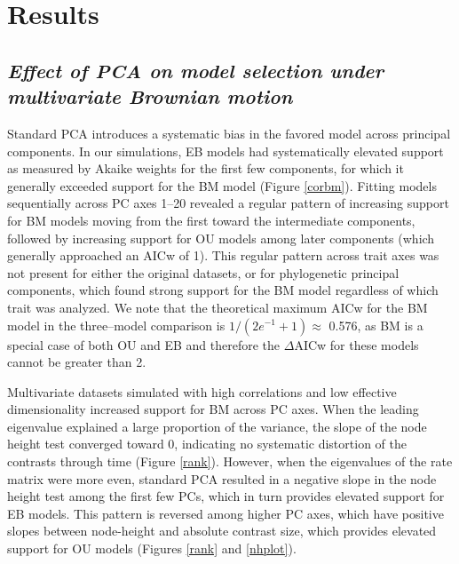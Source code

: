\documentclass[a4paper,11pt]{article}
\begin{document}
\section{Results}
\subsection{\emph{Effect of PCA on model selection under multivariate Brownian motion}}
Standard PCA introduces a systematic bias in the favored model across principal components. In our simulations, EB models had systematically elevated support as measured by Akaike weights for the first few components, for which it generally exceeded support for the BM model (Figure \ref{corbm}). Fitting models sequentially across PC axes 1--20 revealed a regular pattern of increasing support for BM models moving from the first toward the intermediate components, followed by increasing support for OU models among later components (which generally approached an AICw of 1). This regular pattern across trait axes was not present for either the original datasets, or for phylogenetic principal components, which found strong support for the BM model regardless of which trait was analyzed. We note that the theoretical maximum AICw for the BM model in the three--model comparison is $1/(2e^{-1} + 1) \approx$ 0.576, as BM is a special case of both OU and EB and therefore the $\Delta$AICw for these models cannot be greater than 2.   

Multivariate datasets simulated with high correlations and low effective dimensionality increased support for BM across PC axes. When the leading eigenvalue explained a large proportion of the variance, the slope of the node height test converged toward 0, indicating no systematic distortion of the contrasts through time (Figure \ref{rank}). However, when the eigenvalues of the rate matrix were more even, standard PCA resulted in a negative slope in the node height test among the first few PCs, which in turn provides elevated support for EB models. This pattern is reversed among higher PC axes, which have positive slopes between node-height and absolute contrast size, which provides elevated support for OU models (Figures \ref{rank} and \ref{nhplot}). 
\end{document}
